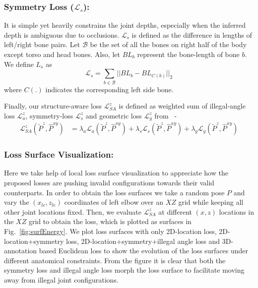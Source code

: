 \documentclass[runningheads]{llncs}
\begin{document}
\vspace{-1em}
\subsubsection{Symmetry Loss ($\mathcal{L}_s$):} It is simple yet heavily constrains the joint depths, especially when the inferred depth is ambiguous due to occlusions. $\mathcal{L}_s$ is defined as the difference in lengths of left/right bone pairs. Let $\mathcal{B}$ be the set of all the bones on right half of the body except torso and head bones. Also, let $BL_b$ represent the bone-length of bone $b$. We define $L_s$ as\\
\begin{equation}
\mathcal{L}_s = \sum_{b \in \mathcal{B}}  \vert\vert{ BL_b - BL_{C(b)}}\vert\vert_2 
\end{equation} 
where $C(.)$ indicates the corresponding left side bone.

Finally, our structure-aware loss $\mathcal{L}^z_{SA}$ is defined as weighted sum of illegal-angle loss $\mathcal{L}^z_{a}$, symmetry-loss $\mathcal{L}^z_{s}$ and geometric loss $\mathcal{L}^z_{g}$ from~\cite{Zhou_2017_ICCV} - 
\begin{equation} \label{eq:l2d}
\begin{split}
\mathcal{L}^z_{SA}(\tilde{P}^z, \hat{P}^{xy}) & =  \lambda_{a} \mathcal{L}_{a}(\tilde{P}^z, \hat{P}^{xy}) + \lambda_{s} \mathcal{L}_{s}(\tilde{P}^z, \hat{P}^{xy})  + \lambda_g\mathcal{L}_{g}(\tilde{P}^z, \hat{P}^{xy})
  \end{split}
\end{equation}
\vspace{-3em}

\subsubsection{Loss Surface Visualization:} Here we take help of local loss surface visualization to appreciate how the proposed losses are pushing invalid configurations towards their valid counterparts. In order to obtain the loss surfaces we take a random pose $P$ and vary the $(x_{le},z_{le})$ coordinates of left elbow over an $XZ$ grid while keeping all other joint locations fixed. Then, we evaluate $\mathcal{L}^z_{SA}$ at different $(x,z)$ locations in the $XZ$ grid to obtain the loss, which is plotted as surfaces in Fig.~\ref{fig:surfEnergy}. We plot loss surfaces with only 2D-location loss, 2D-location+symmetry loss, 2D-location+symmetry+illegal angle loss and 3D-annotation based Euclidean loss to show the evolution of the loss surfaces under different anatomical constraints. From the figure it is clear that both the symmetry loss and illegal angle loss morph the loss surface to facilitate moving away from illegal joint configurations.
\end{document}
